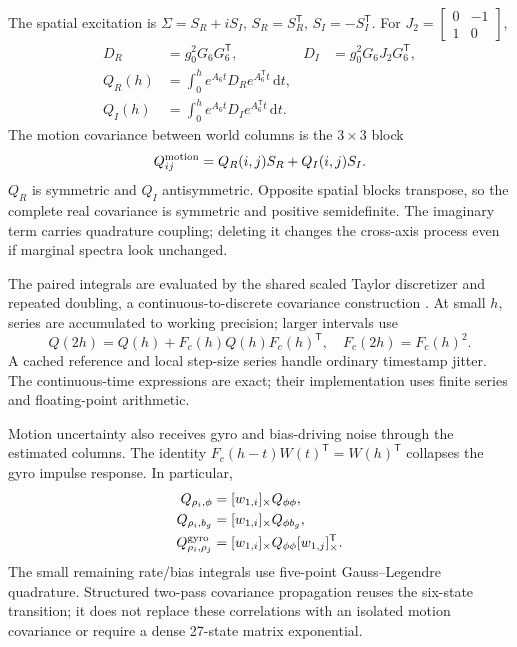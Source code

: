\documentclass[conference]{IEEEtran}
\newcommand{\tr}{^{\mathsf T}}
\newcommand{\sk}[1]{[#1]_\times}
\newcommand{\dd}{\mathrm d}
\begin{document}
The spatial excitation is $\Sigma=S_R+iS_I$, $S_R=S_R\tr$, $S_I=-S_I\tr$.
For $J_2=\left[\begin{smallmatrix}0&-1\\1&0\end{smallmatrix}\right]$,
\begin{align}
 D_R&=g_0^2G_6G_6\tr,&D_I&=g_0^2G_6J_2G_6\tr,\\
 Q_R(h)&=\int_0^h e^{A_6t}D_Re^{A_6\tr t}\,\dd t,\\
 Q_I(h)&=\int_0^h e^{A_6t}D_Ie^{A_6\tr t}\,\dd t.
\end{align}
The motion covariance between world columns is the $3\times3$ block
\begin{equation}
 Q^{\rm motion}_{ij}=Q_R(i,j)S_R+Q_I(i,j)S_I.
 \label{eq:Qpair}
\end{equation}
$Q_R$ is symmetric and $Q_I$ antisymmetric. Opposite spatial blocks transpose,
so the complete real covariance is symmetric and positive semidefinite.
The imaginary term carries quadrature coupling; deleting it changes the
cross-axis process even if marginal spectra look unchanged.

The paired integrals are evaluated by the shared scaled Taylor discretizer
and repeated doubling, a continuous-to-discrete covariance construction
\cite{vanloan}. At small $h$, series are accumulated to working precision;
larger intervals use
\begin{equation}
 Q(2h)=Q(h)+F_c(h)Q(h)F_c(h)\tr,\quad F_c(2h)=F_c(h)^2.
\end{equation}
A cached reference and local step-size series handle ordinary timestamp
jitter. The continuous-time expressions are exact; their implementation uses
finite series and floating-point arithmetic.

Motion uncertainty also receives gyro and bias-driving noise through the
estimated columns. The identity
$F_c(h-t)W(t)\tr=W(h)\tr$ collapses the gyro impulse response. In particular,
\begin{align}
 Q_{\rho_i,\phi}&=\sk{w_{1,i}}Q_{\phi\phi},\\
 Q_{\rho_i,b_g}&=\sk{w_{1,i}}Q_{\phi b_g},\\
 Q^{\rm gyro}_{\rho_i,\rho_j}&=
       \sk{w_{1,i}}Q_{\phi\phi}\sk{w_{1,j}}\tr.
\end{align}
The small remaining rate/bias integrals use five-point Gauss--Legendre
quadrature. Structured two-pass covariance propagation reuses the six-state
transition; it does not replace these correlations with an isolated motion
covariance or require a dense 27-state matrix exponential.
\end{document}
